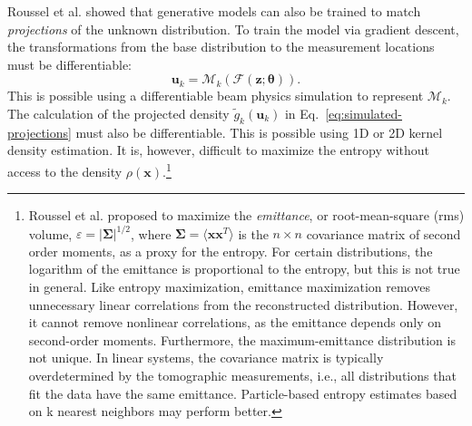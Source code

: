 \documentclass[%
    reprint,
    twocolumn,
    nofootinbib,
    amsmath,
    amssymb,
    aps,
    prstab,
]{revtex4-2}
\newcommand{\vect}[1]{\boldsymbol{\mathbf{#1}}}
\begin{document}
Roussel et al. \cite{Roussel_2023} showed that generative models can also be trained to match \textit{projections} of the unknown distribution. To train the model via gradient descent, the transformations from the base distribution to the measurement locations must be differentiable:
%
\begin{equation}
    \vect{u}_k  = \mathcal{M}_k ( \mathcal{F}(\vect{z}; \vect{\theta}) ).
\end{equation}
%
This is possible using a differentiable beam physics simulation \cite{Kaiser_2024} to represent $\mathcal{M}_k$. The calculation of the projected density $\tilde{g}_k(\vect{u}_k)$ in Eq.~\eqref{eq:simulated-projections} must also be differentiable. This is possible using 1D or 2D kernel density estimation. It is, however, difficult to maximize the entropy without access to the density $\rho(\vect{x})$.\footnote{Roussel et al. \cite{Roussel_2023} proposed to maximize the \textit{emittance}, or root-mean-square (rms) volume, $\varepsilon = {|\vect{\Sigma}|}^{1/2}$, where $\vect{\Sigma} = \langle \vect{x}\vect{x}^T \rangle$ is the $n \times n$ covariance matrix of second order moments, as a proxy for the entropy. For certain distributions, the logarithm of the emittance is proportional to the entropy, but this is not true in general. Like entropy maximization, emittance maximization removes unnecessary linear correlations from the reconstructed distribution. However, it cannot remove nonlinear correlations, as the emittance depends only on second-order moments. Furthermore, the maximum-emittance distribution is not unique. In linear systems, the covariance matrix is typically overdetermined by the tomographic measurements, i.e., all distributions that fit the data have the same emittance. Particle-based entropy estimates based on k nearest neighbors \cite{Ao_2022_entropy} may perform better.}
\end{document}
